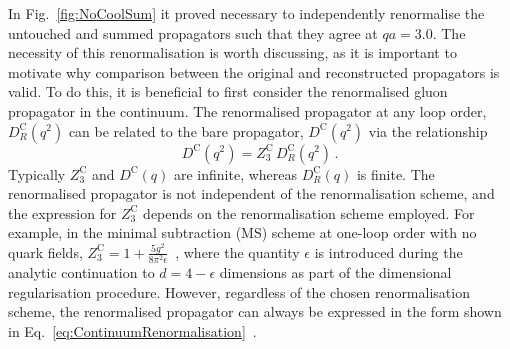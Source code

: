 In Fig.~\ref{fig:NoCoolSum} it proved necessary to independently renormalise the untouched and summed propagators such that they agree at $qa=3.0$. The necessity of this renormalisation is worth discussing, as it is important to motivate why comparison between the original and reconstructed propagators is valid. To do this, it is beneficial to first consider the renormalised gluon propagator in the continuum. The renormalised propagator at any loop order, $D_R^\text{C}(q^2)$ can be related to the bare propagator, $D^\text{C}(q^2)$ via the relationship
%
\begin{equation}
D^\text{C}(q^2) = Z^\text{C}_3 \, D_R^\text{C}(q^2)\, .
\label{eq:ContinuumRenormalisation}
\end{equation}
%
Typically $Z^\text{C}_3$ and $D^\text{C}(q)$ are infinite, whereas $D_R^\text{C}(q)$ is finite. The renormalised propagator is not independent of the renormalisation scheme, and the expression for $Z^\text{C}_3$ depends on the renormalisation scheme employed. For example, in the minimal subtraction (MS) scheme at one-loop order with no quark fields, $Z_3^\text{C}=1+\frac{5g^2}{8\pi^2\epsilon}$~\cite{ryder1996quantum}, where the quantity $\epsilon$ is introduced during the analytic continuation to $d = 4-\epsilon$ dimensions as part of the dimensional regularisation procedure. However, regardless of the chosen renormalisation scheme, the renormalised propagator can always be expressed in the form shown in Eq.~\ref{eq:ContinuumRenormalisation}~\cite{vanRitbergen:1997va}.\\

